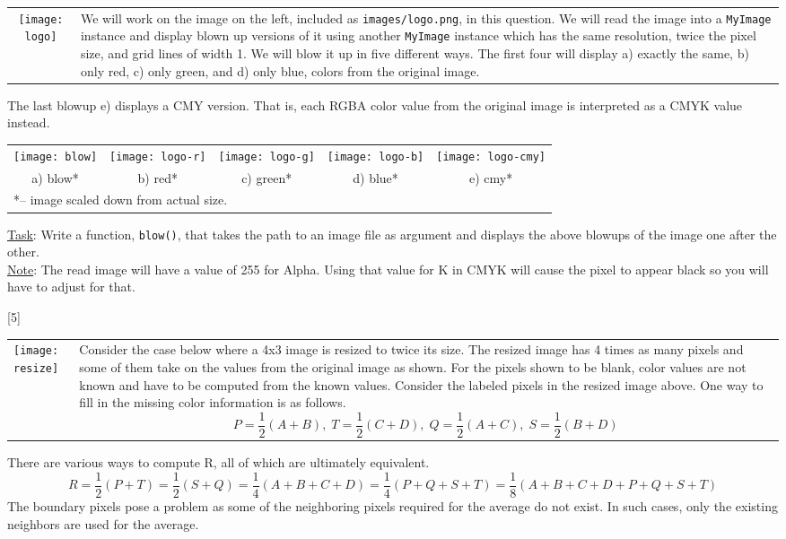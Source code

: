 \documentclass[addpoints]{exam}
\begin{document}
\begin{questions}
  \begin{tabularx}{\textwidth}{cX}
    \texttt{[image: logo]} & We will work on the image on the left, included as \texttt{images/logo.png}, in this question. We will read the image into a \texttt{MyImage} instance and display blown up versions of it using another \texttt{MyImage} instance which has the same resolution, twice the pixel size, and grid lines of width 1. We will blow it up in five different ways. The first four will display a) exactly the same, b) only red, c) only green, and d) only blue, colors from the original image.
  \end{tabularx}
  The last blowup e) displays a CMY version. That is, each RGBA color value from the original image is interpreted as a CMYK value instead.
  \begin{center}
    \begin{tabular}{*{5}{c}}
      \texttt{[image: blow]}
      & \texttt{[image: logo-r]}
      & \texttt{[image: logo-g]}
      & \texttt{[image: logo-b]}
      & \texttt{[image: logo-cmy]}
      \\ a) blow* & b) red* & c) green* & d) blue* & e) cmy*
      \\\multicolumn{5}{l}{*-- image scaled down from actual size.}
    \end{tabular}
  \end{center}
  \underline{Task}: Write a function, \texttt{blow()}, that takes the path to an image file as argument and displays the above blowups of the image one after the other.\\
  \underline{Note}: The read image will have a value of 255 for Alpha. Using that value for K in CMYK will cause the pixel to appear black so you will have to adjust for that. 
  
[5]
  \noindent\begin{tabularx}{\textwidth}{lX}
    \texttt{[image: resize]}
    & 
    Consider the case below where a 4x3 image is resized to twice its size. The resized image has 4 times as many pixels and some of them take on the values from the original image as shown. For the pixels shown to be blank, color values are not known and have to be computed from the known values. 
    Consider the labeled pixels in the resized image above. One way to fill in the missing color information is as follows.
    \[
      P = \frac{1}{2}(A + B),\; T = \frac{1}{2}(C + D),\; Q = \frac{1}{2}(A + C),\; S = \frac{1}{2}(B + D)
    \]
  \end{tabularx}
  There are various ways to compute R, all of which are ultimately equivalent.
  \[
    R = \frac{1}{2}(P + T) = \frac{1}{2}(S + Q) =  \frac{1}{4}(A + B + C + D) = \frac{1}{4}(P + Q + S + T) = \frac{1}{8}(A + B + C + D + P + Q + S + T)
  \]
  The boundary pixels pose a problem as some of the neighboring pixels required for the average do not exist. In such cases, only the existing neighbors are used for the average.


\end{questions}
\end{document}
